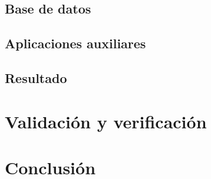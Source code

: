 \documentclass[10pt,a4paper]{article}
\begin{document}
	\subsection{Base de datos}
	
	\subsection{Aplicaciones auxiliares}
	
	\subsection{Resultado}
	
	
	\section{Validación y verificación}
	
	
	\section{Conclusión}
\end{document}

